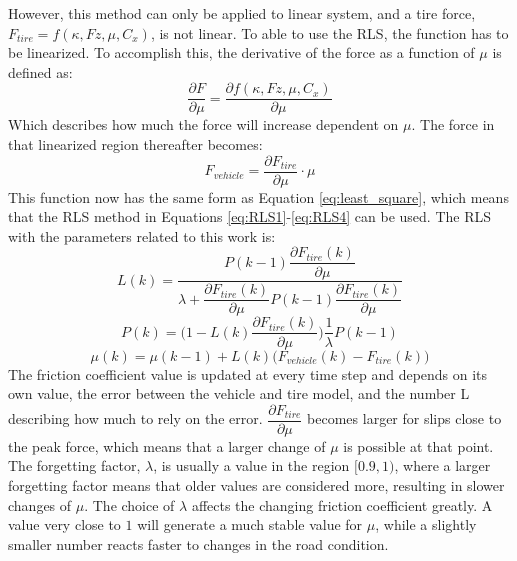 However, this method can only be applied to linear system, and a tire force, $F_{tire}=f(\kappa, Fz, \mu, C_{x})$, is not linear. To able to use the RLS, the function has to be linearized. To accomplish this, the derivative of the force as a function of $ \mu $ is defined as:
\begin{equation}
	\dfrac{\partial F}{\partial \mu} = \dfrac{\partial f(\kappa, Fz, \mu, C_{x})}{\partial \mu}
\end{equation}
Which describes how much the force will increase dependent on $ \mu $. The force in that linearized region thereafter becomes:
\begin{equation}
	F_{vehicle} = \dfrac{\partial F_{tire}}{\partial \mu} \cdot \mu
\end{equation}
This function now has the same form as Equation \ref{eq:least_square}, which means that the RLS method in Equations \ref{eq:RLS1}-\ref{eq:RLS4} can be used. The RLS with the parameters related to this work is:
\begin{equation}
	L(k) =\dfrac{ P(k-1) \dfrac{\partial F_{tire}(k)}{\partial \mu}}{\lambda + \dfrac{\partial F_{tire}(k)}{\partial \mu} P(k-1) \dfrac{\partial F_{tire}(k)}{\partial \mu}} 
\end{equation}
\begin{equation}
	P(k) = \Bigg( 1 - L(k) \dfrac{\partial F_{tire}(k)}{\partial \mu} \Bigg) \dfrac{1}{\lambda} P(k-1)
\end{equation}
\begin{equation}
	\mu (k) = \mu (k-1) + L(k) \Big( F_{vehicle} (k) - F_{tire} (k) \Big)
\end{equation}
The friction coefficient value is updated at every time step and depends on its own value, the error between the vehicle and tire model, and the number L describing how much to rely on the error. $ \dfrac{\partial F_{tire}}{\partial \mu} $ becomes larger for slips close to the peak force, which means that a larger change of $ \mu $ is possible at that point. The forgetting factor, $ \lambda $, is usually a value in the region $ [0.9, 1) $, where a larger forgetting factor means that older values are considered more, resulting in slower changes of $ \mu $. The choice of $ \lambda $ affects the changing friction coefficient greatly. A value very close to $ 1 $ will generate a much stable value for $ \mu $, while a slightly smaller number reacts faster to changes in the road condition.

